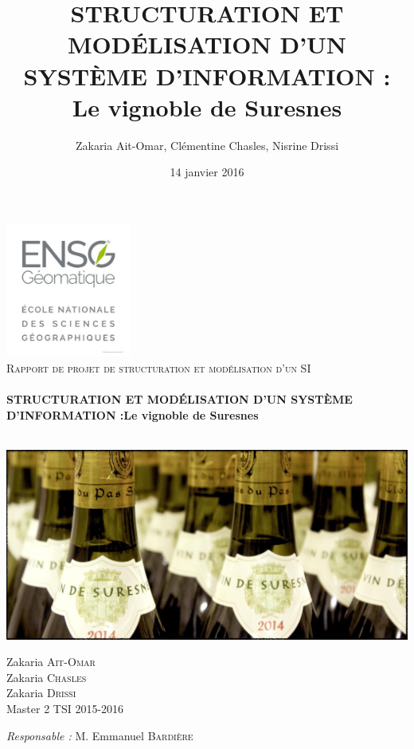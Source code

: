 \documentclass[a4paper, titlepage]{report}
\title{STRUCTURATION ET MODÉLISATION D'UN SYSTÈME D'INFORMATION : Le
vignoble de Suresnes}
\author{Zakaria Ait-Omar, Clémentine Chasles, Nisrine Drissi}
\date{14 janvier 2016}
\begin{document}
\begin{titlepage}
  \begin{sffamily}
  \begin{center}

    \includegraphics[widht=4.13cm, height=4.38cm]{Images/ensg.jpg}~\\[1.5cm]

    \textsc{\Large Rapport de projet de structuration et modélisation d'un SI}\\[1.5cm]

    \HRule \\[0.4cm]
    { \huge \bfseries STRUCTURATION ET MODÉLISATION D'UN SYSTÈME D'INFORMATION :\newline Le vignoble de Suresnes\\[0.4cm] }

    \HRule \\[2cm]
    \includegraphics{Images/pagecouv.jpg}
    \\[2cm]

    \begin{minipage}{0.4\textwidth}
      \begin{flushleft} \large
        Zakaria \textsc{Ait-Omar}\\
        Zakaria \textsc{Chasles}\\
        Zakaria \textsc{Drissi}\\
        Master 2 TSI 2015-2016\\
      \end{flushleft}
    \end{minipage}
    \begin{minipage}{0.4\textwidth}
      \begin{flushright} \large
        \emph{Responsable :} M. Emmanuel \textsc{Bardière}\\
      \end{flushright}
    \end{minipage}


\end{center}
\end{sffamily}
\end{titlepage}
\end{document}
